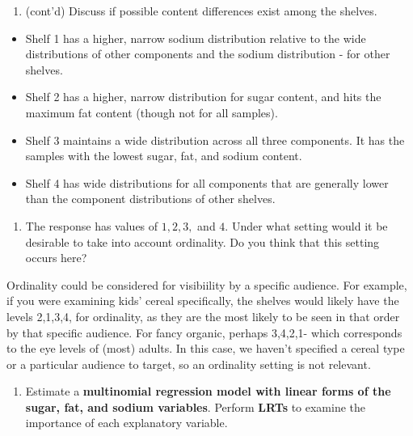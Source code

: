 \documentclass[11pt,]{article}
\providecommand{\tightlist}{%
  \setlength{\itemsep}{0pt}\setlength{\parskip}{0pt}}
\begin{document}
\begin{enumerate}
\def\labelenumi{\alph{enumi}.}
\setcounter{enumi}{1}
\tightlist
\item
  (cont'd) Discuss if possible content differences exist among the
  shelves.\\
\end{enumerate}

\begin{itemize}
\tightlist
\item
  Shelf 1 has a higher, narrow sodium distribution relative to the wide
  distributions of other components and the sodium distribution - for
  other shelves.\\
\item
  Shelf 2 has a higher, narrow distribution for sugar content, and hits
  the maximum fat content (though not for all samples).\\
\item
  Shelf 3 maintains a wide distribution across all three components. It
  has the samples with the lowest sugar, fat, and sodium content.
\item
  Shelf 4 has wide distributions for all components that are generally
  lower than the component distributions of other shelves. \newpage
\end{itemize}

\begin{enumerate}
\def\labelenumi{\alph{enumi}.}
\setcounter{enumi}{2}
\tightlist
\item
  The response has values of \(1, 2, 3,\) and \(4\). Under what setting
  would it be desirable to take into account ordinality. Do you think
  that this setting occurs here?
\end{enumerate}

Ordinality could be considered for visibiility by a specific audience.
For example, if you were examining kids' cereal specifically, the
shelves would likely have the levels 2,1,3,4, for ordinality, as they
are the most likely to be seen in that order by that specific audience.
For fancy organic, perhaps 3,4,2,1- which corresponds to the eye levels
of (most) adults. In this case, we haven't specified a cereal type or a
particular audience to target, so an ordinality setting is not relevant.

\begin{enumerate}
\def\labelenumi{\alph{enumi}.}
\setcounter{enumi}{3}
\tightlist
\item
  Estimate a \textbf{multinomial regression model with linear forms of
  the sugar, fat, and sodium variables}. Perform \textbf{LRTs} to
  examine the importance of each explanatory variable.
\end{enumerate}
\end{document}
